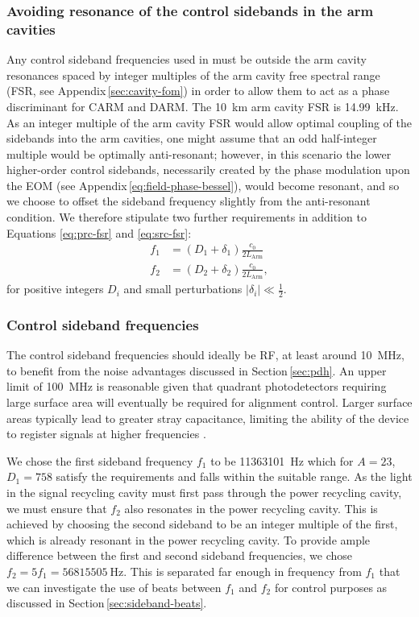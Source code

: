 \subsubsection{Avoiding resonance of the control sidebands in the arm cavities}
Any control sideband frequencies used in \ETLF{} must be outside the arm cavity resonances spaced by integer multiples of the arm cavity free spectral range (\gls{FSR}, see Appendix\,\ref{sec:cavity-fom}) in order to allow them to act as a phase discriminant for \gls{CARM} and \gls{DARM}. The \SI{10}{\kilo\meter} arm cavity \gls{FSR} is \SI{14.99}{\kilo\hertz}. As an integer multiple of the arm cavity \gls{FSR} would allow optimal coupling of the sidebands into the arm cavities, one might assume that an odd half-integer multiple would be optimally anti-resonant; however, in this scenario the lower higher-order control sidebands, necessarily created by the phase modulation upon the \gls{EOM} (see Appendix\,\ref{eq:field-phase-bessel}), would become resonant, and so we choose to offset the sideband frequency slightly from the anti-resonant condition. We therefore stipulate two further requirements in addition to Equations \ref{eq:prc-fsr} and \ref{eq:src-fsr}:
\begin{align}
  \label{eq:arm-fsr}
  f_1 &= \left(D_{1} + \delta_{1} \right) \frac{c_0}{2 L_{\text{Arm}}} \\
  f_2 &= \left(D_{2} + \delta_{2} \right) \frac{c_0}{2 L_{\text{Arm}}},
\end{align}
for positive integers $D_{i}$ and small perturbations $\left| \delta_{i} \right| \ll \frac{1}{2}$.

\subsubsection{Control sideband frequencies}
The control sideband frequencies should ideally be \gls{RF}, at least around \SI{10}{\mega\hertz}, to benefit from the noise advantages discussed in Section\,\ref{sec:pdh}. An upper limit of \SI{100}{\mega\hertz} is reasonable given that quadrant photodetectors requiring large surface area will eventually be required for alignment control. Larger surface areas typically lead to greater stray capacitance, limiting the ability of the device to register signals at higher frequencies \cite{Freise2010}.

We chose the first sideband frequency $f_1$ to be \SI{11363101}{\hertz} which for $A = 23$, $D_{1} = 758$ satisfy the requirements and falls within the suitable range. As the light in the signal recycling cavity must first pass through the power recycling cavity, we must ensure that $f_2$ also resonates in the power recycling cavity. This is achieved by choosing the second sideband to be an integer multiple of the first, which is already resonant in the power recycling cavity. To provide ample difference between the first and second sideband frequencies, we chose $f_2 = 5f_1 = \SI{56815505}{\hertz}$. This is separated far enough in frequency from $f_1$ that we can investigate the use of beats between $f_1$ and $f_2$ for control purposes as discussed in Section\,\ref{sec:sideband-beats}.

